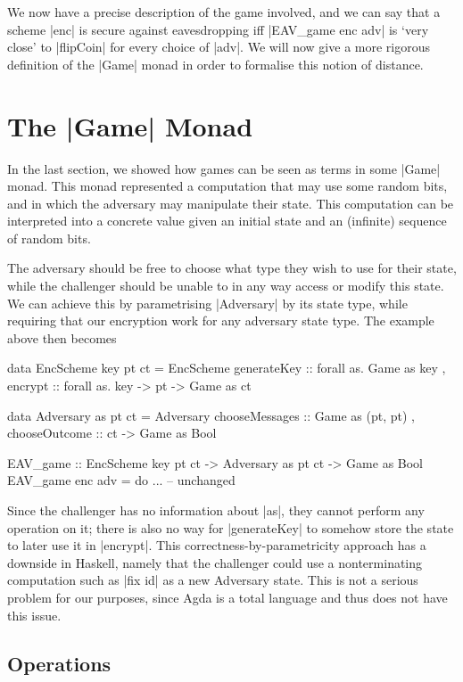 We now have a precise description of the game involved, and we can say that a scheme |enc| is secure against
eavesdropping iff |EAV_game enc adv| is `very close' to |flipCoin| for every choice of |adv|.  We will now give a more
rigorous definition of the |Game| monad in order to formalise this notion of distance.

\section{The |Game| Monad}

In the last section, we showed how games can be seen as terms in some |Game| monad.  This monad represented a
computation that may use some random bits, and in which the adversary may manipulate their state.  This computation can
be interpreted into a concrete value given an initial state and an (infinite) sequence of random bits.

The adversary should be free to choose what type they wish to use for their state, while the challenger should be unable
to in any way access or modify this state.  We can achieve this by parametrising |Adversary| by its state type, while
requiring that our encryption work for any adversary state type.  The example above then becomes
\begin{code}
data EncScheme key pt ct = EncScheme
                         { generateKey :: forall as. Game as key
                         , encrypt :: forall as. key -> pt -> Game as ct
                         }

data Adversary as pt ct = Adversary
                        { chooseMessages :: Game as (pt, pt)
                        , chooseOutcome :: ct -> Game as Bool
                        }

EAV_game :: EncScheme key pt ct -> Adversary as pt ct -> Game as Bool
EAV_game enc adv = do
    ... -- unchanged
\end{code}

Since the challenger has no information about |as|, they cannot perform any operation on it; there is also no way for
|generateKey| to somehow store the state to later use it in |encrypt|.  This correctness-by-parametricity approach has a
downside in Haskell, namely that the challenger could use a nonterminating computation such as |fix id| as a new
Adversary state.  This is not a serious problem for our purposes, since Agda is a total language and thus does not have
this issue.

\subsection{Operations}

